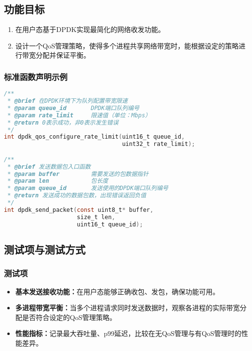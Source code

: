 \subsection{功能目标}
\begin{enumerate}
    \item 在用户态基于DPDK实现最简化的网络收发功能。
    \item 设计一个QoS管理策略，使得多个进程共享网络带宽时，能根据设定的策略进行带宽分配并保证平衡。
\end{enumerate}

\subsubsection{标准函数声明示例}
\begin{lstlisting}[language=C, caption={示例：DPDK QoS管理接口}]
/**
 * @brief 在DPDK环境下为队列配置带宽限速
 * @param queue_id       DPDK端口队列编号
 * @param rate_limit     限速值（单位：Mbps）
 * @return 0表示成功，非0表示发生错误
 */
int dpdk_qos_configure_rate_limit(uint16_t queue_id, 
                                  uint32_t rate_limit);

/**
 * @brief 发送数据包入口函数
 * @param buffer         需要发送的包数据指针
 * @param len            包长度
 * @param queue_id       发送使用的DPDK端口队列编号
 * @return 发送成功的数据包数，出现错误返回负值
 */
int dpdk_send_packet(const uint8_t* buffer, 
                     size_t len, 
                     uint16_t queue_id);
\end{lstlisting}

\subsection{测试项与测试方式}
\subsubsection{测试项}
\begin{itemize}
    \item \textbf{基本发送接收功能：}在用户态能够正确收包、发包，确保功能可用。
    \item \textbf{多进程带宽平衡：}当多个进程请求同时发送数据时，观察各进程的实际带宽分配是否符合设定的QoS管理策略。
    \item \textbf{性能指标：}记录最大吞吐量、p99延迟，比较在无QoS管理与有QoS管理时的性能差异。
\end{itemize}

